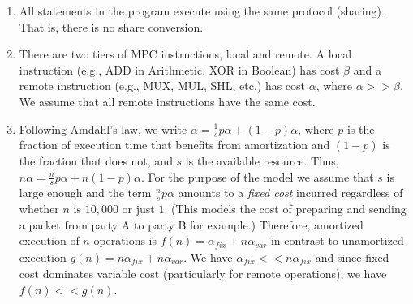 \begin{enumerate}

\item All statements in the program execute using the same protocol (sharing). That is, there is no share conversion.
\item There are two tiers of MPC instructions, local and remote. A local instruction (e.g., ADD in Arithmetic, XOR in Boolean) 
has cost $\beta$ and a remote instruction (e.g., MUX, MUL, SHL, etc.) has cost $\alpha$, where $\alpha >> \beta$. We assume that all remote
instructions have the same cost.
\item  %
Following Amdahl's law, we write $\alpha = \frac{1}{s}p\alpha + (1-p)\alpha$, where $p$ is the fraction of execution time that benefits from amortization and $(1-p)$
is the fraction that does not, and $s$ is the available resource. Thus, $n\alpha = \frac{n}{s}p\alpha + n(1-p)\alpha$.
For the purpose of the model we assume that $s$ is large enough and the term $\frac{n}{s}p\alpha$ amounts to a \emph{fixed cost} incurred regardless of
whether $n$ is $10,000$ or just $1$. (This models the cost of preparing and sending a packet from party A to party B for example.) Therefore, amortized execution
of $n$ operations is $f(n) = \alpha_\mathit{fix} + n\alpha_{var}$ in contrast to unamortized execution $g(n) = n\alpha_\mathit{fix} + n\alpha_{var}$.
We have $\alpha_\mathit{fix} << n\alpha_\mathit{fix}$ and since fixed cost dominates variable cost (particularly for remote operations), we have $f(n) << g(n)$.

\end{enumerate}
